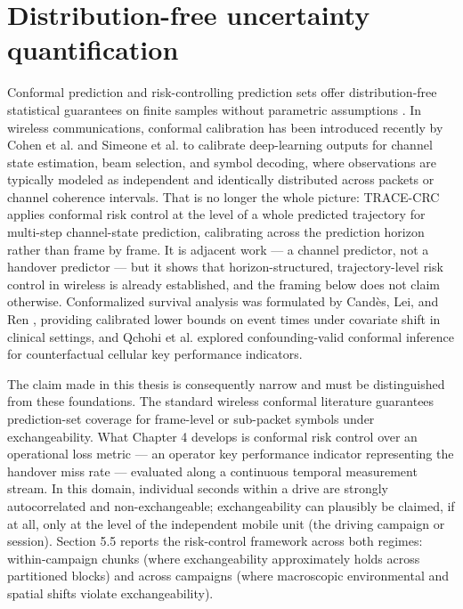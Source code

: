 \section{Distribution-free uncertainty quantification}
\label{sec:2_6}

Conformal prediction and risk-controlling prediction sets offer distribution-free statistical guarantees on finite samples without parametric assumptions \cite{ref21, ref22}. In wireless communications, conformal calibration has been introduced recently by Cohen et al. \cite{ref19} and Simeone et al. \cite{ref20} to calibrate deep-learning outputs for channel state estimation, beam selection, and symbol decoding, where observations are typically modeled as independent and identically distributed across packets or channel coherence intervals. That is no longer the whole picture: TRACE-CRC \cite{ref55} applies conformal risk control at the level of a whole predicted trajectory for multi-step channel-state prediction, calibrating across the prediction horizon rather than frame by frame. It is adjacent work --- a channel predictor, not a handover predictor --- but it shows that horizon-structured, trajectory-level risk control in wireless is already established, and the framing below does not claim otherwise. Conformalized survival analysis was formulated by Cand\`es, Lei, and Ren \cite{ref18}, providing calibrated lower bounds on event times under covariate shift in clinical settings, and Qchohi et al. \cite{ref47} explored confounding-valid conformal inference for counterfactual cellular key performance indicators.

The claim made in this thesis is consequently narrow and must be distinguished from these foundations. The standard wireless conformal literature \cite{ref19, ref20} guarantees prediction-set coverage for frame-level or sub-packet symbols under exchangeability. What Chapter 4 develops is conformal risk control \cite{ref21} over an operational loss metric --- an operator key performance indicator representing the handover miss rate --- evaluated along a continuous temporal measurement stream. In this domain, individual seconds within a drive are strongly autocorrelated and non-exchangeable; exchangeability can plausibly be claimed, if at all, only at the level of the independent mobile unit (the driving campaign or session). Section 5.5 reports the risk-control framework across both regimes: within-campaign chunks (where exchangeability approximately holds across partitioned blocks) and across campaigns (where macroscopic environmental and spatial shifts violate exchangeability).

